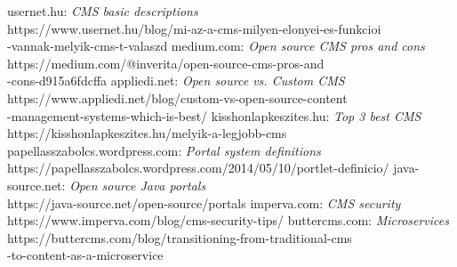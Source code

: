 \begin{thebibliography}{x}
 usernet.hu: {\em CMS basic descriptions}\\
{\ttfamily https://www.usernet.hu/blog/mi-az-a-cms-milyen-elonyei-es-funkcioi\\-vannak-melyik-cms-t-valaszd}
 medium.com: {\em Open source CMS pros and cons}\\
{\ttfamily https://medium.com/@inverita/open-source-cms-pros-and\\-cons-d915a6fdcffa}
 appliedi.net: {\em Open source vs. Custom CMS}\\
{\ttfamily https://www.appliedi.net/blog/custom-vs-open-source-content\\-management-systems-which-is-best/}
 kisshonlapkeszites.hu: {\em Top 3 best CMS}\\
{\ttfamily https://kisshonlapkeszites.hu/melyik-a-legjobb-cms}
 papellasszabolcs.wordpress.com: {\em Portal system definitions}\\
{\ttfamily https://papellasszabolcs.wordpress.com/2014/05/10/portlet-definicio/}
 java-source.net: {\em Open source Java portals}\\
{\ttfamily https://java-source.net/open-source/portals}
 imperva.com: {\em CMS security}\\
{\ttfamily https://www.imperva.com/blog/cms-security-tips/}
 buttercms.com: {\em Microservices}\\
{\ttfamily https://buttercms.com/blog/transitioning-from-traditional-cms\\-to-content-as-a-microservice}
\end{thebibliography}

